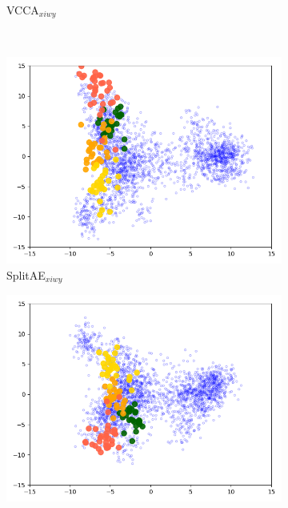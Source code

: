 \begin{figure}[t]
\begin{subfigure}[b]{0.40\textwidth}
         \caption{VCCA$_{xiwy}$}
         \label{fig:vcca_xiwy_comparison}
     \end{subfigure} \\
     \begin{subfigure}[b]{0.40\textwidth}
         \centering
         \includegraphics[width=\textwidth]{PaperB/figures_and_tables/latent_space_visualizations/splitae_vcca_comparison/pca_latent_peppers_splitae_xiwy_seed2.png}
         \caption{SplitAE$_{xiwy}$}
         \label{fig:splitae_xiwy_bell_peppers_comparison}
     \end{subfigure}
     \begin{subfigure}[b]{0.40\textwidth}
         \centering
         \includegraphics[width=\textwidth]{PaperB/figures_and_tables/latent_space_visualizations/splitae_vcca_comparison/pca_latent_peppers_vcca_xiwy_seed2.png}

\end{subfigure}
\end{figure}
